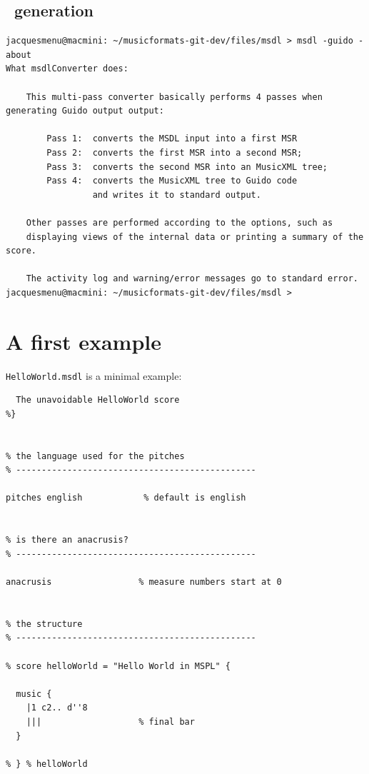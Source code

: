   \subsection{\guido\ generation}

\begin{lstlisting}[language=Terminal]
jacquesmenu@macmini: ~/musicformats-git-dev/files/msdl > msdl -guido -about
What msdlConverter does:

    This multi-pass converter basically performs 4 passes when generating Guido output output:

        Pass 1:  converts the MSDL input into a first MSR
        Pass 2:  converts the first MSR into a second MSR;
        Pass 3:  converts the second MSR into an MusicXML tree;
        Pass 4:  converts the MusicXML tree to Guido code
                 and writes it to standard output.

    Other passes are performed according to the options, such as
    displaying views of the internal data or printing a summary of the score.

    The activity log and warning/error messages go to standard error.
jacquesmenu@macmini: ~/musicformats-git-dev/files/msdl >

\end{lstlisting}

\section{A first example}

{\tt HelloWorld.msdl} is a minimal example:
\begin{lstlisting}[language=CPlusPlus]
%{
  The unavoidable HelloWorld score
%}


% the language used for the pitches
% -----------------------------------------------

pitches english            % default is english


% is there an anacrusis?
% -----------------------------------------------

anacrusis                 % measure numbers start at 0


% the structure
% -----------------------------------------------

% score helloWorld = "Hello World in MSPL" {

  music {
    |1 c2.. d''8
    |||                   % final bar
  }

% } % helloWorld
\end{lstlisting}


